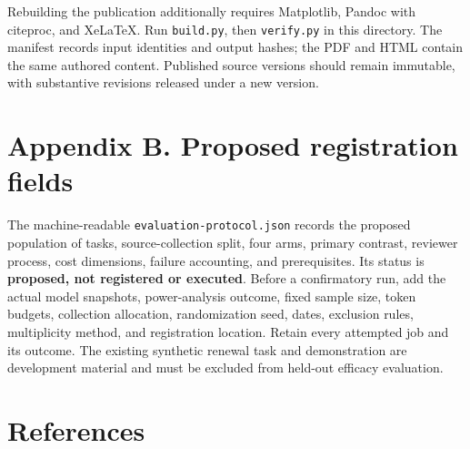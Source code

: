 \documentclass[
  11pt,
]{article}
\let\originalsection\section
\renewcommand{\section}{\Needspace{5\baselineskip}\originalsection}
\begin{document}
Rebuilding the publication additionally requires Matplotlib, Pandoc with
citeproc, and XeLaTeX. Run \texttt{build.py}, then \texttt{verify.py} in
this directory. The manifest records input identities and output hashes;
the PDF and HTML contain the same authored content. Published source
versions should remain immutable, with substantive revisions released
under a new version.

\section*{Appendix B. Proposed registration
fields}\label{appendix-b.-proposed-registration-fields}

The machine-readable \texttt{evaluation-protocol.json} records the
proposed population of tasks, source-collection split, four arms,
primary contrast, reviewer process, cost dimensions, failure accounting,
and prerequisites. Its status is \textbf{proposed, not registered or
executed}. Before a confirmatory run, add the actual model snapshots,
power-analysis outcome, fixed sample size, token budgets, collection
allocation, randomization seed, dates, exclusion rules, multiplicity
method, and registration location. Retain every attempted job and its
outcome. The existing synthetic renewal task and demonstration are
development material and must be excluded from held-out efficacy
evaluation.

\section*{References}\label{references}
\end{document}
